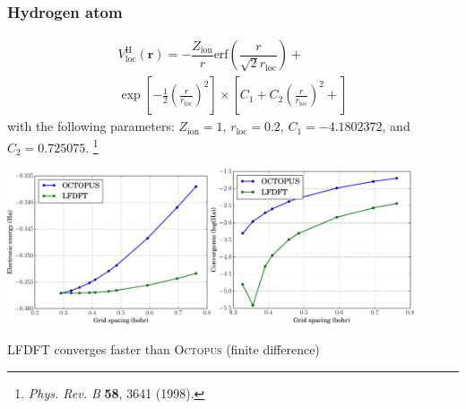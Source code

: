 \documentclass[10pt,t]{beamer}
\begin{document}
\begin{frame}
\frametitle{Hydrogen atom}

\begin{multline}
  V^{\mathrm{H}}_{\mathrm{loc}}(\mathbf{r}) = 
  -\dfrac{Z_{\mathrm{ion}}}{r}
  \mathrm{erf}\left(
  \dfrac{r}{\sqrt{2}r_{\mathrm{loc}}}
  \right) + \\
  \exp
  \left[ -\frac{1}{2}
  \left( \frac{r}{r_{\mathrm{loc}}}\right)^2
  \right]
  \times
  \left[
  C_{1} +
  C_{2}\left( \frac{r}{r_{\mathrm{loc}}}\right)^2 +
\right]
\end{multline}
with the following parameters:
$Z_{\mathrm{ion}} = 1$, $r_{\mathrm{loc}} = 0.2$,
$C_{1} = -4.1802372$, and $C_{2} = 0.725075$.
\footnote{
  \textit{Phys. Rev. B}  \textbf{58}, 3641 (1998). 
}

\end{frame}

\begin{frame}[plain,c]
  
{\centering
\includegraphics[width=0.45\textwidth]{images/atom_H.pdf}\includegraphics[width=0.45\textwidth]{images/CONV_atom_H.pdf}
\par
LFDFT converges faster than \textsc{Octopus} (finite difference)
\par}
  
\end{frame}
\end{document}
